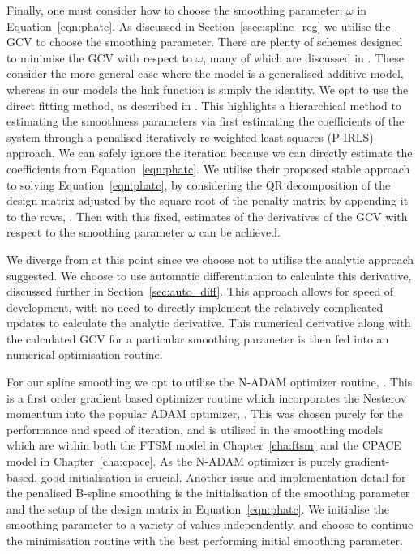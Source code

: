 Finally, one must consider how to choose the smoothing parameter; $\omega$ in Equation~\ref{eqn:phatc}.
As discussed in Section~\ref{ssec:spline_reg} we utilise the GCV to choose the smoothing parameter.
There are plenty of schemes designed to minimise the GCV with respect to $\omega$, many of which are discussed in \citep{wood_fast_2011}.
These consider the more general case where the model is a generalised additive model, whereas in our models the link function is simply the identity.
We opt to use the direct fitting method, as described in \citep{wood_fast_2008}.
This highlights a hierarchical method to estimating the smoothness parameters via first estimating the coefficients of the system through a penalised iteratively re-weighted least squares (P-IRLS) approach.
We can safely ignore the iteration because we can directly estimate the coefficients from Equation~\ref{eqn:phatc}.
We utilise their proposed stable approach to solving Equation~\ref{eqn:phatc}, by considering the QR decomposition of the design matrix adjusted by the square root of the penalty matrix by appending it to the rows, \citep{wood_fast_2008}.
Then with this fixed, estimates of the derivatives of the GCV with respect to the smoothing parameter $\omega$ can be achieved.

We diverge from \citep{wood_fast_2008} at this point since we choose not to utilise the analytic approach suggested.
We choose to use automatic differentiation to calculate this derivative, discussed further in Section~\ref{sec:auto_diff}.
This approach allows for speed of development, with no need to directly implement the relatively complicated updates to calculate the analytic derivative.
This numerical derivative along with the calculated GCV for a particular smoothing parameter is then fed into an numerical optimisation routine.

For our spline smoothing we opt to utilise the N-ADAM optimizer routine, \citep{dozat_incorporating_2016}.
This is a first order gradient based optimizer routine which incorporates the Nesterov momentum into the popular ADAM optimizer, \citep{dozat_incorporating_2016}.
This was chosen purely for the performance and speed of iteration, and is utilised in the smoothing models which are within both the FTSM model in Chapter~\ref{cha:ftsm} and the CPACE model in Chapter~\ref{cha:cpace}.
As the N-ADAM optimizer is purely gradient-based, good initialisation is crucial.
Another issue and implementation detail for the penalised B-spline smoothing is the initialisation of the smoothing parameter and the setup of the design matrix in Equation~\ref{eqn:phatc}.
We initialise the smoothing parameter to a variety of values independently, and choose to continue the minimisation routine with the best performing initial smoothing parameter.

